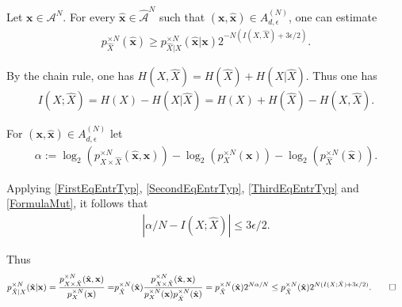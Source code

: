 \begin{frame}
\begin{lemma}
Let $\mathbf{x}\in\mathcal{A}^N$. For every $\hat{\mathbf{x}}\in\hat{\mathcal{A}}^N$ such that $(\mathbf{x}, \hat{\mathbf{x}})\in A_{d, \epsilon}^{(N)}$, one can estimate
\begin{align}\label{EstLemmCondMarg}
p^{\times N}_{\hat{X}}(\hat{\mathbf{x}})\geq p^{\times N}_{\hat{X}|X}(\hat{\mathbf{x}}|\mathbf{x})2^{-N(I(X,\hat{X})+ 3\epsilon/2)}.
\end{align}
\end{lemma}
\vspace{-0.1cm}
\small
{} 
\vspace{-0.13cm}
\bit
\item By the chain rule, one has $H(X,\hat{X})=H(\hat{X})+H(X|\hat{X})$. Thus one has
\begin{align}\label{FormulaMut}
I(X;\hat{X})=H(X)-H(X|\hat{X})=H(X)+H(\hat{X})-H(X,\hat{X}). 
\end{align}
\item For $(\mathbf{x},\hat{\mathbf{x}})\in A_{d,\epsilon}^{(N)}$ let
\begin{align*}
\alpha:=\log_2(p^{\times N}_{X\times\hat{X}}(\hat{\mathbf{x}},\mathbf{x}))-\log_2(p^{\times N}_X(\mathbf{x}))-\log_2(p^{\times N}_{\hat{X}}(\hat{\mathbf{x}})).
\end{align*}
\item Applying \eqref{FirstEqEntrTyp}, \eqref{SecondEqEntrTyp}, \eqref{ThirdEqEntrTyp} and \eqref{FormulaMut}, it follows that 
\begin{align*}
|\alpha/N-I(X;\hat{X})|\leq 3\epsilon/2. 
\end{align*}

\item Thus 
\begin{align*}
p^{\times N}_{\hat{X}|X}(\hat{\mathbf{x}}|\mathbf{x})=\frac{p^{\times N}_{X\times\hat{X}}(\hat{\mathbf{x}},\mathbf{x})}{p^{\times N}_X(\mathbf{x})}
=&p^{\times N}_{\hat{X}}(\hat{\mathbf{x}})\frac{p^{\times N}_{X\times\hat{X}}(\hat{\mathbf{x}},\mathbf{x})}{p^{\times N}_X(\mathbf{x})p^{\times N}_{\hat{X}}(\hat{\mathbf{x}})}
=p^{\times N}_{\hat{X}}(\hat{\mathbf{x}})2^{N\alpha/N}\leq p^{\times N}_{\hat{X}}(\hat{\mathbf{x}}) 2^{N(I(X;\hat{X})+3\epsilon/2)}. \qed
\end{align*}
\eit
\end{frame}
